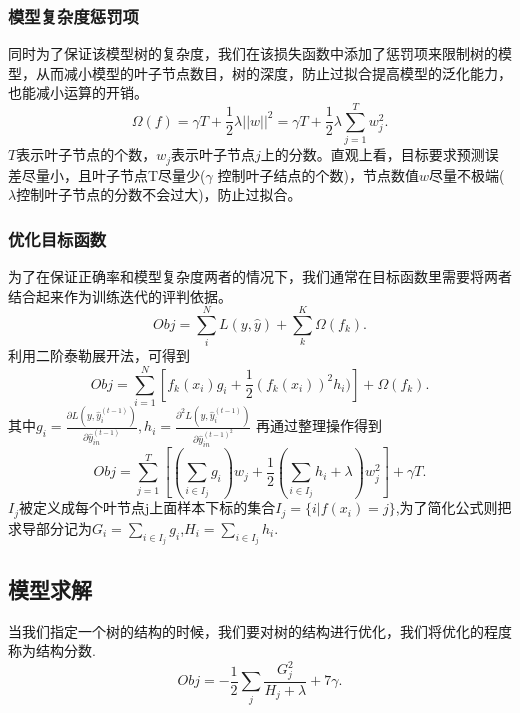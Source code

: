 \documentclass{whutmod}
\begin{document}
\subsubsection{模型复杂度惩罚项}
同时为了保证该模型树的复杂度，我们在该损失函数中添加了惩罚项来限制树的模型，从而减小模型的叶子节点数目，树的深度，防止过拟合提高模型的泛化能力，也能减小运算的开销。
\begin{equation}
\Omega(f)=\gamma T+\frac{1}{2}\lambda ||w||^2=\gamma T+\frac{1}{2}\lambda \sum_{j=1}^T w_j^2.
\end{equation}
$T$表示叶子节点的个数，$w_j$表示叶子节点$j$上的分数。直观上看，目标要求预测误差尽量小，且叶子节点T尽量少($\gamma$ 控制叶子结点的个数)，节点数值$w$尽量不极端($\lambda$控制叶子节点的分数不会过大)，防止过拟合。

\subsubsection{优化目标函数}
为了在保证正确率和模型复杂度两者的情况下，我们通常在目标函数里需要将两者结合起来作为训练迭代的评判依据。
\begin{equation}
Obj=\sum_i^N L(y, \hat{y})+\sum_k^K \Omega(f_k).
\end{equation}
利用二阶泰勒展开法，可得到
\begin{equation}
Obj=\sum_{i=1}^N[f_k(x_i)g_i+\frac{1}{2}(f_k(x_i))^2h_i)]+\Omega(f_k).
\end{equation}
其中$g_i=\frac{\partial L(y, \hat{y}_{i}^{(t-1)})}{\partial \hat{y}_{in}^{(t-1)}},h_i=\frac{\partial^2 L(y, \hat{y}_{i}^{(t-1)})}{\partial \hat{y}_{in}^{(t-1)^2}}$
再通过整理操作得到
\begin{equation}
Obj=\sum_{j=1}^T[(\sum_{i \in I_j} g_i )w_j+\frac{1}{2}(\sum_{i \in I_j} h_i+\lambda)w_j^2]+\gamma T.
\end{equation}
$I_j$被定义成每个叶节点j上面样本下标的集合$I_j=\{i|f(x_i)=j\}$,为了简化公式则把求导部分记为$G_i=\sum_{i \in I_j} g_i$,$H_i=\sum_{i \in I_j} h_i$.
\subsection{模型求解}
当我们指定一个树的结构的时候，我们要对树的结构进行优化，我们将优化的程度称为结构分数.
\begin{equation}
Obj=-\frac{1}{2}\sum_{j}\frac{G_{j}^{2}}{H_{j}+\lambda}+7\gamma.
\end{equation}
\end{document}
